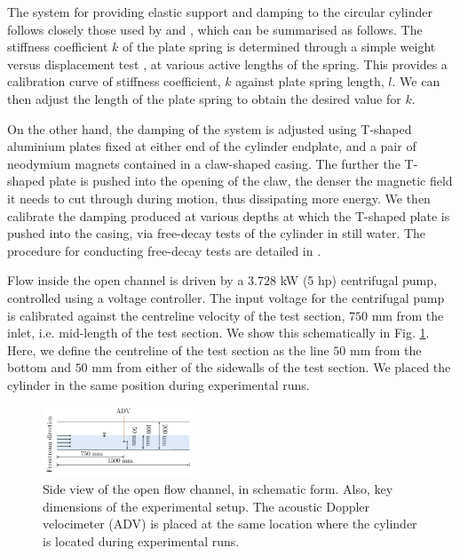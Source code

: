 \documentclass[a4paper,fleqn]{cas-sc}
\begin{document}
The system for providing elastic support and damping to the circular cylinder follows closely those used by \citet{Kawabata2013} and \citet{Koide2013,Koide2017}, which can be summarised as follows. The stiffness coefficient $k$ of the plate spring is determined through a simple weight versus displacement test \citep{Sun2016}, at various active lengths of the spring. This provides a calibration curve of stiffness coefficient, $k$ against plate spring length, $l$. We can then adjust the length of the plate spring to obtain the desired value for $k$.

On the other hand, the damping of the system is adjusted using T-shaped aluminium plates fixed at either end of the cylinder endplate, and a pair of neodymium magnets contained in a claw-shaped casing. The further the T-shaped plate is pushed into the opening of the claw, the denser the magnetic field it needs to cut through during motion, thus dissipating more energy. We then calibrate the damping produced at various depths at which the T-shaped plate is pushed into the casing, via free-decay tests of the cylinder in still water. The procedure for conducting free-decay tests are detailed in \citet{Raghavan2007}.

Flow inside the open channel is driven by a $3.728$ kW (5 hp) centrifugal pump, controlled using a voltage controller. The input voltage for the centrifugal pump is calibrated against the centreline velocity of the test section, $750$ mm from the inlet, i.e. mid-length of the test section. We show this schematically in Fig. \ref{fig:keyDimensions}. Here, we define the centreline of the test section as the line $50$ mm from the bottom and $50$ mm from either of the sidewalls of the test section. We placed the cylinder in the same position during experimental runs.

\begin{figure}
  \centering
  \includegraphics[width=0.4\textwidth]{figs/figure4}
  \caption{Side view of the open flow channel, in schematic form. Also, key dimensions of the experimental setup. The acoustic Doppler velocimeter (ADV) is placed at the same location where the cylinder is located during experimental runs.}
  \label{fig:keyDimensions}
\end{figure}
\end{document}
